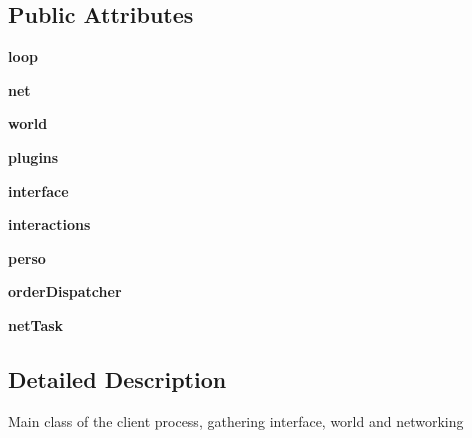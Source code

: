\subsection*{\-Public \-Attributes}
\begin{DoxyCompactItemize}
\item 
\hypertarget{classclient_1_1_client_a8cb5660eab73a84ffff78f931fba9f4a}{{\bfseries loop}}\label{classclient_1_1_client_a8cb5660eab73a84ffff78f931fba9f4a}

\item 
\hypertarget{classclient_1_1_client_a0bfd89eab5cd378c69d11a95ec3e9771}{{\bfseries net}}\label{classclient_1_1_client_a0bfd89eab5cd378c69d11a95ec3e9771}

\item 
\hypertarget{classclient_1_1_client_a514fa5a25b192d7c319dac3e81589139}{{\bfseries world}}\label{classclient_1_1_client_a514fa5a25b192d7c319dac3e81589139}

\item 
\hypertarget{classclient_1_1_client_a155c1a6cd1cd389f752946ae1be7df4e}{{\bfseries plugins}}\label{classclient_1_1_client_a155c1a6cd1cd389f752946ae1be7df4e}

\item 
\hypertarget{classclient_1_1_client_ac94a649fda29e1ef94a92729ce7c345c}{{\bfseries interface}}\label{classclient_1_1_client_ac94a649fda29e1ef94a92729ce7c345c}

\item 
\hypertarget{classclient_1_1_client_a2c24cff4ee58fef1de7de126cef3840e}{{\bfseries interactions}}\label{classclient_1_1_client_a2c24cff4ee58fef1de7de126cef3840e}

\item 
\hypertarget{classclient_1_1_client_a3f9927aadf41668bb2398b6404296076}{{\bfseries perso}}\label{classclient_1_1_client_a3f9927aadf41668bb2398b6404296076}

\item 
\hypertarget{classclient_1_1_client_a55b0a0b65f2cbc5bbeab157000db0ff4}{{\bfseries order\-Dispatcher}}\label{classclient_1_1_client_a55b0a0b65f2cbc5bbeab157000db0ff4}

\item 
\hypertarget{classclient_1_1_client_a80840f1460afc8548a654b36e7ca69f0}{{\bfseries net\-Task}}\label{classclient_1_1_client_a80840f1460afc8548a654b36e7ca69f0}

\end{DoxyCompactItemize}


\subsection{\-Detailed \-Description}
\begin{DoxyVerb}Main class of the client process, gathering interface, world and networking\end{DoxyVerb}
 

